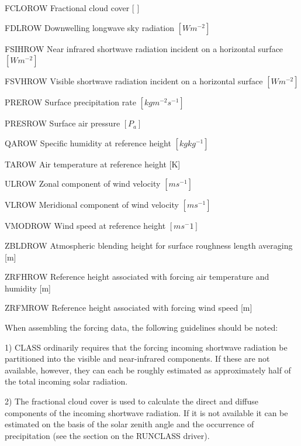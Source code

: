 \begin{DoxyItemize}
\item F\+C\+L\+O\+R\+O\+W Fractional cloud cover \mbox{[} \mbox{]}
\item F\+D\+L\+R\+O\+W Downwelling longwave sky radiation $[ W m^{-2} ]$
\item F\+S\+I\+H\+R\+O\+W Near infrared shortwave radiation incident on a horizontal surface $[W m^{-2} ]$
\item F\+S\+V\+H\+R\+O\+W Visible shortwave radiation incident on a horizontal surface $[W m^{-2} ]$
\item P\+R\+E\+R\+O\+W Surface precipitation rate $[kg m^{-2} s^{-1} ]$
\item P\+R\+E\+S\+R\+O\+W Surface air pressure $[P_a ]$
\item Q\+A\+R\+O\+W Specific humidity at reference height $[kg kg^{-1} ]$
\item T\+A\+R\+O\+W Air temperature at reference height \mbox{[}K\mbox{]}
\item U\+L\+R\+O\+W Zonal component of wind velocity $[m s^{-1} ]$
\item V\+L\+R\+O\+W Meridional component of wind velocity $[m s^{-1} ]$
\item V\+M\+O\+D\+R\+O\+W Wind speed at reference height $[m s^-1 ]$
\item Z\+B\+L\+D\+R\+O\+W Atmospheric blending height for surface roughness length averaging \mbox{[}m\mbox{]}
\item Z\+R\+F\+H\+R\+O\+W Reference height associated with forcing air temperature and humidity \mbox{[}m\mbox{]}
\item Z\+R\+F\+M\+R\+O\+W Reference height associated with forcing wind speed \mbox{[}m\mbox{]}
\end{DoxyItemize}

When assembling the forcing data, the following guidelines should be noted\+:

1) C\+L\+A\+S\+S ordinarily requires that the forcing incoming shortwave radiation be partitioned into the visible and near-\/infrared components. If these are not available, however, they can each be roughly estimated as approximately half of the total incoming solar radiation.

2) The fractional cloud cover is used to calculate the direct and diffuse components of the incoming shortwave radiation. If it is not available it can be estimated on the basis of the solar zenith angle and the occurrence of precipitation (see the section on the R\+U\+N\+C\+L\+A\+S\+S driver).

